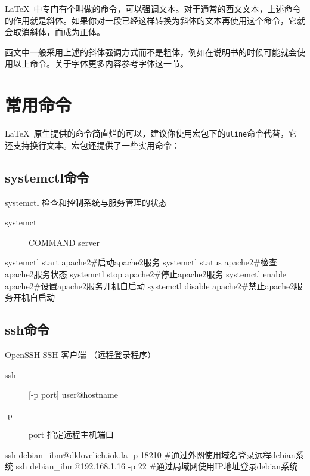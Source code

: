 \LaTeX\ 中专门有个叫做的命令，可以强调文本。对于通常的西文文本，上述命令的作用就是斜体。如果你对一段已经这样转换为斜体的文本再使用这个命令，它就会取消斜体，而成为正体。

西文中一般采用上述的斜体强调方式而不是粗体，例如在说明书的时候可能就会使用以上命令。关于字体更多内容参考字体这一节。

\section{常用命令}
\LaTeX\ 原生提供的命令简直烂的可以，建议你使用宏包下的\texttt{uline}命令代替，它还支持换行文本。宏包还提供了一些实用命令：
\subsection{systemctl命令}
	systemctl 检查和控制系统与服务管理的状态
	\begin{description}
		\item[systemctl] COMMAND server
	\end{description}
\begin{shell}
systemctl start apache2#启动apache2服务
systemctl status apache2#检查apache2服务状态
systemctl stop apache2#停止apache2服务
systemctl enable apache2#设置apache2服务开机自启动
systemctl disable apache2#禁止apache2服务开机自启动
\end{shell}
\subsection{ssh命令}
	OpenSSH SSH 客户端 （远程登录程序）
	\begin{description}
		\item[ssh] [-p port] user@hostname
		\item[-p] port 指定远程主机端口
	\end{description}
\begin{shell}
ssh debian_ibm@dklovelich.iok.la -p 18210 #通过外网使用域名登录远程debian系统
ssh debian_ibm@192.168.1.16 -p 22 #通过局域网使用IP地址登录debian系统
\end{shell}
